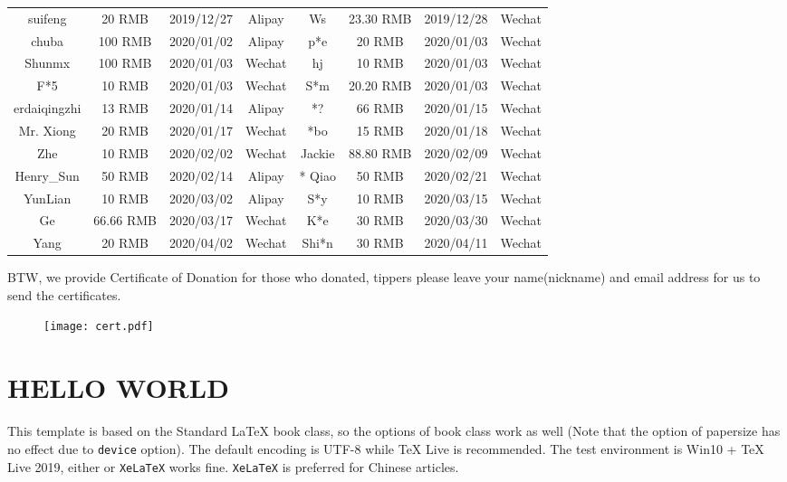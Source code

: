 \documentclass[11pt,fancy,twocol]{elegantbook}
\begin{document}
\begin{table}[!htb]
\begin{tabular}{*{4}{>{\scriptsize}c}|*{4}{>{\scriptsize}c}}
    suifeng   & 20 RMB & 2019/12/27 & Alipay   & Ws    & 23.30 RMB & 2019/12/28 & Wechat \\
    chuba    & 100 RMB  & 2020/01/02 & Alipay   & p*e   & 20 RMB & 2020/01/03 & Wechat \\
    Shunmx & 100 RMB & 2020/01/03 & Wechat    & hj    & 10 RMB & 2020/01/03 & Wechat \\
    F*5   & 10 RMB & 2020/01/03 & Wechat    & S*m   & 20.20 RMB & 2020/01/03 & Wechat \\
    erdaiqingzhi  & 13 RMB & 2020/01/14 & Alipay   & *?    & 66 RMB & 2020/01/15 & Wechat \\
    Mr. Xiong & 20 RMB & 2020/01/17 & Wechat    & *bo    & 15 RMB & 2020/01/18 & Wechat \\
    *Zhe    & 10 RMB & 2020/02/02 & Wechat    &  Jackie &  88.80 RMB  &  2020/02/09 & Wechat \\
    Henry\_Sun & 50 RMB & 2020/02/14 & Alipay & * Qiao  & 50 RMB & 2020/02/21 & Wechat \\
    YunLian & 10 RMB & 2020/03/02 & Alipay & S*y  &  10 RMB  &  2020/03/15 & Wechat \\
    * Ge  & 66.66 RMB & 2020/03/17 & Wechat    &   K*e & 30 RMB & 2020/03/30 & Wechat\\
    * Yang  &  20 RMB  &  2020/04/02 & Wechat & Shi*n  & 30 RMB & 2020/04/11 & Wechat \\
    \bottomrule
  \end{tabular}%
  \label{tab:donation}%
\end{table}%

BTW, we provide Certificate of Donation for those who donated, tippers please leave your name(nickname) and email address for us to send the certificates.

\begin{figure}[!htb]
  \centering
  \texttt{[image: cert.pdf]}
\end{figure}

\part{HELLO WORLD}

This template is based on the Standard \LaTeX{} book class, so the options of book class work as well (Note that the option of papersize has no effect due to \lstinline{device} option). The default encoding is UTF-8 while \TeX{} Live is recommended. The test environment is Win10 + \TeX{} Live 2019, either  or \lstinline{XeLaTeX} works fine. \lstinline{XeLaTeX} is preferred for Chinese articles.
\end{document}
